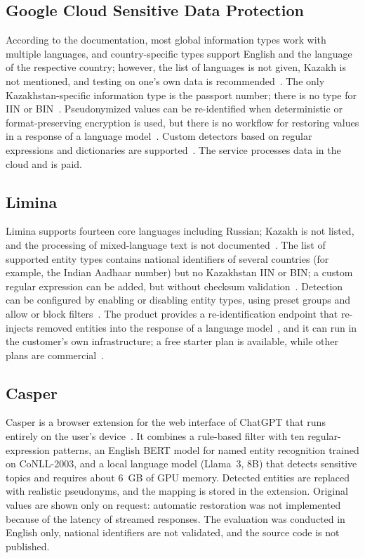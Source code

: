 \documentclass[12pt,a4paper]{article}
\begin{document}
\subsection{Google Cloud Sensitive Data Protection}

According to the documentation, most global information types work with multiple languages, and country-specific types support English and the language of the respective country; however, the list of languages is not given, Kazakh is not mentioned, and testing on one's own data is recommended~\cite{gcp-types}. The only Kazakhstan-specific information type is the passport number; there is no type for IIN or BIN~\cite{gcp-ref}. Pseudonymized values can be re-identified when deterministic or format-preserving encryption is used, but there is no workflow for restoring values in a response of a language model~\cite{gcp-pseudo}. Custom detectors based on regular expressions and dictionaries are supported~\cite{gcp-custom}. The service processes data in the cloud and is paid.

\subsection{Limina}

Limina supports fourteen core languages including Russian; Kazakh is not listed, and the processing of mixed-language text is not documented~\cite{limina-lang}. The list of supported entity types contains national identifiers of several countries (for example, the Indian Aadhaar number) but no Kazakhstan IIN or BIN; a custom regular expression can be added, but without checksum validation~\cite{limina-ent}. Detection can be configured by enabling or disabling entity types, using preset groups and allow or block filters~\cite{limina-cfg}. The product provides a re-identification endpoint that re-injects removed entities into the response of a language model~\cite{limina-reid}, and it can run in the customer's own infrastructure; a free starter plan is available, while other plans are commercial~\cite{limina}.

\subsection{Casper}

Casper is a browser extension for the web interface of ChatGPT that runs entirely on the user's device~\cite{casper}. It combines a rule-based filter with ten regular-expression patterns, an English BERT model for named entity recognition trained on CoNLL-2003, and a local language model (Llama~3, 8B) that detects sensitive topics and requires about 6~GB of GPU memory. Detected entities are replaced with realistic pseudonyms, and the mapping is stored in the extension. Original values are shown only on request: automatic restoration was not implemented because of the latency of streamed responses. The evaluation was conducted in English only, national identifiers are not validated, and the source code is not published.
\end{document}
